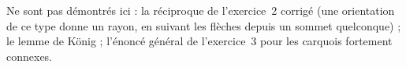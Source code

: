 Ne sont pas démontrés ici : la réciproque de l'exercice~2 corrigé (une orientation de ce type donne un rayon, en suivant les flèches depuis un sommet quelconque) ; le lemme de König ; l'énoncé général de l'exercice~3 pour les carquois fortement connexes.

